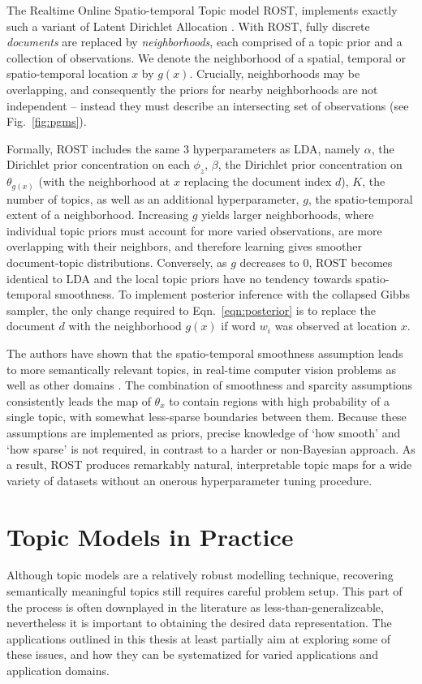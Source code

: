 The Realtime Online Spatio-temporal Topic model ROST, implements exactly such a variant of Latent Dirichlet Allocation \citep{Girdhar2014}. With ROST, fully discrete \emph{documents} are replaced by \emph{neighborhoods}, each comprised of a topic prior and a collection of observations. We denote the neighborhood of a spatial, temporal or spatio-temporal location $x$ by $g(x)$. Crucially, neighborhoods may be overlapping, and consequently the priors for nearby neighborhoods are not independent -- instead they must describe an intersecting set of observations (see Fig.~\ref{fig:pgms}).

Formally, ROST includes the same 3 hyperparameters as LDA, namely $\alpha$, the Dirichlet prior concentration on each $\phi_z$, $\beta$, the Dirichlet prior concentration on $\theta_{g(x)}$ (with the neighborhood at $x$ replacing the document index $d$), $K$, the number of topics, as well as an additional hyperparameter, $g$, the spatio-temporal extent of a neighborhood. Increasing $g$ yields larger neighborhoods, where individual topic priors must account for more varied observations, are more overlapping with their neighbors, and therefore learning gives smoother document-topic distributions. Conversely, as $g$ decreases to 0, ROST becomes identical to LDA and the local topic priors have no tendency towards spatio-temporal smoothness. To implement posterior inference with the collapsed Gibbs sampler, the only change required to Eqn.~\ref{eqn:posterior} is to replace the document $d$ with the neighborhood $g(x)$ if word $w_i$ was observed at location $x$. 

The authors have shown that the spatio-temporal smoothness assumption leads to more semantically relevant topics, in real-time computer vision problems as well as other domains \citep{Girdhar2012, Girdhar2014a, Girdhar2016}. The combination of smoothness and sparcity assumptions consistently leads the map of $\theta_x$ to contain regions with high probability of a single topic, with somewhat less-sparse boundaries between them. Because these assumptions are implemented as priors, precise knowledge of `how smooth' and `how sparse' is not required, in contrast to a harder or non-Bayesian approach. As a result, ROST produces remarkably natural, interpretable topic maps for a wide variety of datasets without an onerous hyperparameter tuning procedure.

\section{Topic Models in Practice} \label{sec:topic-models-inpractice}
Although topic models are a relatively robust modelling technique, recovering semantically meaningful topics still requires careful problem setup. This part of the process is often downplayed in the literature as less-than-generalizeable, nevertheless it is important to obtaining the desired data representation. The applications outlined in this thesis at least partially aim at exploring some of these issues, and how they can be systematized for varied applications and application domains.

